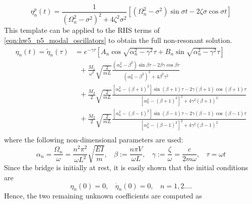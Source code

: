 \begin{enumerate}[(i)]
{    \begin{equation}
        \eta_n^p(t) = \frac{1}{{(\Omega_n^2 - \sigma^2)}^2 + 4\zeta^2 \sigma^2} \left[(\Omega_n^2 - \sigma^2) \sin\sigma t - 2 \zeta \sigma \cos\sigma t \right]
    \end{equation}
    This template can be applied to the RHS terms of \cref{eqn:hw5_p5_modal_oscillators} to obtain the full non-resonant solution.
    \begin{equation}
    \begin{aligned}
        \eta_n(t) = \tilde{\eta}_n(\tau) &= e^{-\gamma \tau} \left[A_n \cos \sqrt{\alpha_n^2 - \gamma^2} \tau + B_n \sin \sqrt{\alpha_n^2 - \gamma^2} \tau\right] \\
        &~~~ +\frac{M_1}{\omega^2} \sqrt{\frac{2}{mL}} \frac{
            \left(\alpha_n^2 -\beta^2\right)\sin \beta \tau - 2\beta\gamma\cos \beta \tau
        }{
            {\left(\alpha_n^2 - \beta^2\right)}^2 + 4\beta^2\gamma^2
        } \\
        &~~~ + \frac{M_2}{2}\sqrt{\frac{2}{mL}} \frac{
            \left[\alpha_n^2 - {(\beta + 1)}^2 \right]\sin (\beta + 1) \tau 
            - 2\gamma(\beta + 1)\cos (\beta + 1) \tau
        }{
            {\left[\alpha_n^2 - {(\beta + 1)}^2 \right]}^2 + 4\gamma^2 {(\beta + 1)}^2
        } \\ 
        &~~~ + \frac{M_2}{2}\sqrt{\frac{2}{mL}} \frac{
            \left[\alpha_n^2 - {(\beta - 1)}^2 \right]\sin (\beta - 1) \tau 
            - 2\gamma(\beta - 1)\cos (\beta - 1) \tau 
        }{
            {\left[\alpha_n^2 - {(\beta - 1)}^2 \right]}^2 + 4\gamma^2 {(\beta - 1)}^2
        } \\ 
    \end{aligned}
    \end{equation}
    where the following non-dimensional parameters are used:
    \begin{equation}
        \alpha_n = \frac{\Omega_n}{\omega} = \frac{n^2\pi^2}{\omega L^2} \sqrt{\frac{EI}{m}}, ~~~~ \beta := \frac{n \pi V}{\omega L}, ~~~~ \gamma := \frac{\zeta}{\omega} = \frac{c}{2m\omega}, ~~~~ \tau = \omega t
    \end{equation} 
    Since the bridge is initially at rest, it is easily shown that the initial conditions are 
    \begin{equation}
        \eta_n(0) = 0, ~~~~ \dot{\eta}_n(0) = 0, ~~~~ n = 1, 2 \ldots.
    \end{equation}
    Hence, the two remaining unknown coefficients are computed as 
    \begin{equation}

\end{equation}}
\end{enumerate}
